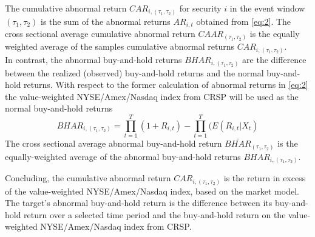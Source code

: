 \documentclass[12pt]{article}
\begin{document}
The cumulative abnormal return $CAR_{i,(\tau_1,\tau_2)}$ for security $i$ in the event window $(\tau_1,\tau_2)$ is the sum of the abnormal returns $AR_{i,t}$ obtained from \eqref{eq:2}. The cross sectional average cumulative abnormal return $CAAR_{(\tau_1,\tau_2)}$ is the equally weighted average of the samples cumulative abnormal returns $CAR_{i,(\tau_1,\tau_2)}$.\\
In contrast, the abnormal buy-and-hold returns $BHAR_{i,(\tau_1,\tau_2)}$ are the difference between the realized (observed) buy-and-hold returns and the normal buy-and-hold returns. With respect to the former calculation of abnormal returns in \eqref{eq:2} the value-weighted NYSE/Amex/Nasdaq index from CRSP will be used as the normal buy-and-hold returns 
\begin{equation}
	BHAR_{i,(\tau_1,\tau_2)}=\prod_{t=1}^{T}(1+R_{i,t})-\prod_{t=1}^{T}(E(R_{i,t}|X_{t})
\end{equation}
The cross sectional average abnormal buy-and-hold return $\overline{BHAR}_{(\tau_1,\tau_2)}$ is the equally-weighted average of the abnormal buy-and-hold returns $BHAR_{i,(\tau_1,\tau_2)}$.

Concluding, the cumulative abnormal return $CAR_{i,(\tau_1,\tau_2)}$ is the return in excess of the value-weighted NYSE/Amex/Nasdaq index, based on the market model. The target's abnormal buy-and-hold return is the difference between its buy-and-hold return over a selected time period and the buy-and-hold return on the value-weighted NYSE/Amex/Nasdaq index from CRSP. 
\end{document}
